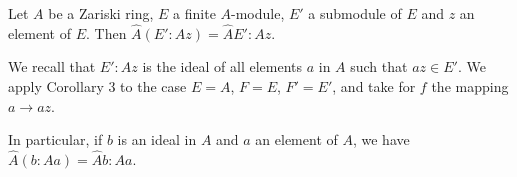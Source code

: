 Let $A$ be a Zariski ring, $E$ a finite $A$-module, $E'$ a submodule of $E$ and $z$ an element of $E$. Then $\hat{A}(E':Az) = \hat{A}E':Az$.

We recall that $E':Az$ is the ideal of all elements $a$ in $A$ such that $az \in E'$. We apply Corollary 3 to the case $E=A$, $F=E$, $F'=E'$, and take for $f$ the mapping $a \rightarrow az$.

In particular, if $b$ is an ideal in $A$ and $a$ an element of $A$, we have $\hat{A}(b:Aa) = \hat{A}b:Aa$.